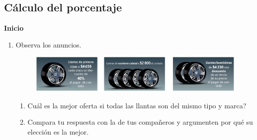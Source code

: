 \documentclass[11pt]{book}
\begin{document}
\subsection{Cálculo del porcentaje}

\begin{boxK}
  \begin{center}\textbf{Inicio}\end{center}

  \begin{enumerate}
    \item Observa los anuncios.
          \begin{figure}[H]
            \centering
            \includegraphics[width=\linewidth]{llantas.png}
          \end{figure}
          \begin{enumerate}
            \item Cuál es la mejor oferta si todas las llantas son del mismo tipo y marca?
            \item Compara tu respuesta con la de tus compañeros y argumenten por qué su elección es la mejor.
          \end{enumerate}
  \end{enumerate}
\end{boxK}
\end{document}
